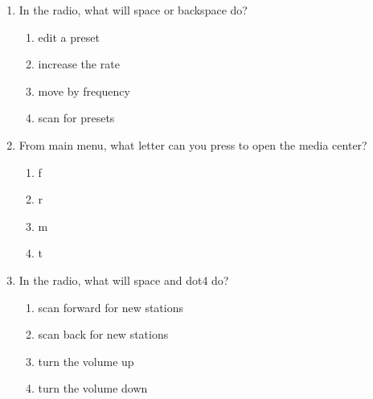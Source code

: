 \documentclass[10pt,letterpaper,twoside]{report}
\begin{document}
{{{{\begin{enumerate}
\begin{enumerate}
		      \item enter with r
		            
		      \item backspace with f
		            
		            
	      \end{enumerate}
	\item In the radio, what will space or backspace do?
	      
	      \begin{enumerate}
		      \item edit a preset
		            
		      \item increase the rate
		            
		      \item move by frequency
		            
		      \item scan for presets
		            
		            
	      \end{enumerate}
	\item From main menu, what letter can you press to open the media center?
	      
	      \begin{enumerate}
		      \item f
		            
		      \item r
		            
		      \item m
		            
		      \item t
		            
		            
	      \end{enumerate}
	\item In the radio, what will space and dot4 do?
	      
	      \begin{enumerate}
		      \item scan forward for new stations
		            
		      \item scan back for new stations
		            
		      \item turn the volume up
		            
		      \item turn the volume down
		            

\end{enumerate}
\end{enumerate}}}}}
\end{document}
